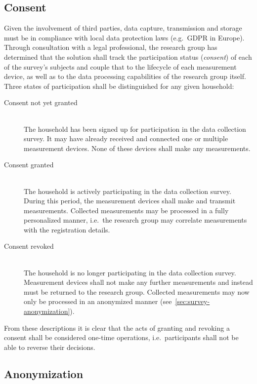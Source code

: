 \subsection{Consent}
\label{sec:survey-consent}

Given the involvement of third parties, data capture, transmission and storage must be in compliance with local data protection laws (e.g.~\acs{GDPR} in Europe). Through consultation with a legal professional, the research group has determined that the solution shall track the participation status (\textit{consent}) of each of the survey's subjects and couple that to the lifecycle of each measurement device, as well as to the data processing capabilities of the research group itself. Three states of participation shall be distinguished for any given household:

\begin{description}
  \item[Consent not yet granted]
  \hfill \\
  The household has been signed up for participation in the data collection survey. It may have already received and connected one or multiple measurement devices. None of these devices shall make any measurements.

  \item[Consent granted]
  \hfill \\
  The household is actively participating in the data collection survey. During this period, the measurement devices shall make and transmit measurements. Collected measurements may be processed in a fully personalized manner, i.e.~the research group may correlate measurements with the registration details.

  \item[Consent revoked]
  \hfill \\
  The household is no longer participating in the data collection survey. Measurement devices shall not make any further measurements and instead must be returned to the research group. Collected measurements may now only be processed in an anonymized manner (see~\autoref{sec:survey-anonymization}).
\end{description}

From these descriptions it is clear that the acts of granting and revoking a consent shall be considered one-time operations, i.e.~participants shall not be able to reverse their decisions.


\subsection{Anonymization}
\label{sec:survey-anonymization}

